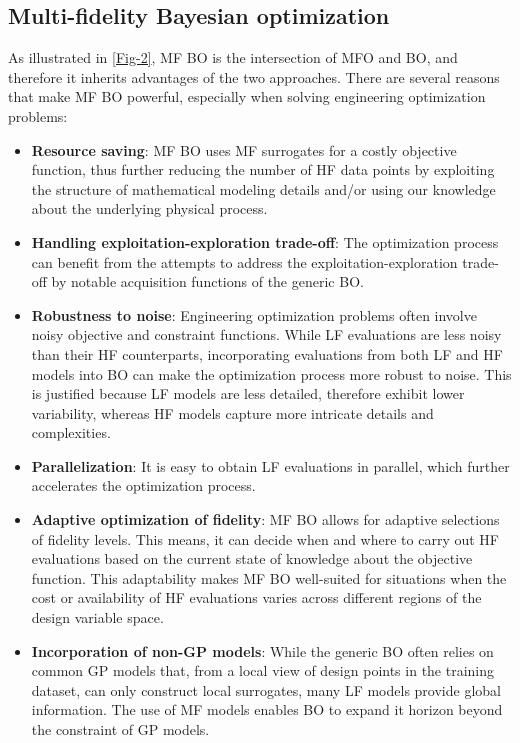 \documentclass[iicol,sn-basic]{sn-jnl}%
\begin{document}
\subsection{Multi-fidelity Bayesian optimization}\label{Sec33}

As illustrated in \cref{Fig-2}, MF BO is the intersection of MFO and BO, and therefore it inherits advantages of the two approaches.
There are several reasons that make MF BO powerful, especially when solving engineering optimization problems:
\begin{itemize}
	\item \textbf{Resource saving}: MF BO uses MF surrogates for a costly objective function, thus further reducing the number of HF data points by exploiting the structure of mathematical modeling details and/or using our knowledge about the underlying physical process.
	
	\item \textbf{Handling exploitation-exploration trade-off}: The optimization process can benefit from the attempts to address the exploitation-exploration trade-off by notable acquisition functions of the generic BO.
	
	\item \textbf{Robustness to noise}: Engineering optimization problems often involve noisy objective and constraint functions.
	While LF evaluations are less noisy than their HF counterparts, incorporating evaluations from both LF and HF models into BO can make the optimization process more robust to noise.
	This is justified because LF models are less detailed, therefore exhibit lower variability, whereas HF models capture more intricate details and complexities.
	
	\item \textbf{Parallelization}: It is easy to obtain LF evaluations in parallel, which further accelerates the optimization process.
	
	\item \textbf{Adaptive optimization of fidelity}: MF BO allows for adaptive selections of fidelity levels.
	This means, it can decide when and where to carry out HF evaluations based on the current state of knowledge about the objective function.
	This adaptability makes MF BO well-suited for situations when the cost or availability of HF evaluations varies across different regions of the design variable space.
	
	\item \textbf{Incorporation of non-GP models}: While the generic BO often relies on common GP models that, from a local view of design points in the training dataset, can only construct local surrogates, many LF models provide global information.
	The use of MF models enables BO to expand it horizon beyond the constraint of GP models.
	
\end{itemize}
\end{document}
